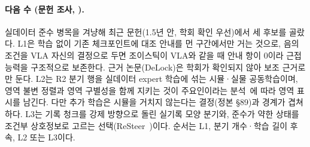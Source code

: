 \paragraph{다음 수 (문헌 조사, ).} 실데이터 준수 병목을 겨냥해 최근 문헌(1.5년 안, 학회 확인 우선)에서 세 후보를 골랐다. L1은 학습 없이 기존 체크포인트에 대조 안내를 먼 구간에서만 거는 것으로, 음의 조건을 VLA 자신의 결정으로 두면 조이스틱이 VLA와 같을 때 안내 항이 0이라 근접 능력을 구조적으로 보존한다. 근거 논문(DeLock)은 학회가 확인되지 않아 보조 근거로만 둔다. L2는 R2 분기 행을 실데이터 expert 학습에 섞는 시뮬·실물 공동학습이며, 영역 불변 정렬과 영역 구별성을 함께 지키는 것이 주요인이라는 분석~\cite{cotrainmech2026}에 따라 영역 표시를 남긴다. 다만 추가 학습은 시뮬을 거치지 않는다는 결정(정본 §89)과 경계가 겹쳐 하다. L3는 기록 청크를 강제 방향으로 돌린 실기록 모양 분기와, 준수가 약한 상태를 조건부 상호정보로 고르는 선택(ReSteer~\cite{resteer2026})이다. 순서는 L1, 분기 개수·학습 길이 후속, L2 또는 L3이다.

